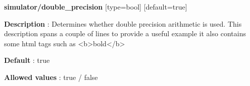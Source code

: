

\begin{DoxyItemize}
\item {\bf \ttfamily simulator/double\_precision} [type=bool] [default=true]
\begin{DoxyItemize}
\item {\bf Description} : Determines whether double precision arithmetic is
used. This description spans a couple of lines to provide a useful example
it also contains some html tags such as <b>bold</b>
\item {\bf Default} : true
\item {\bf Allowed values} : true / false
\end{DoxyItemize}
\end{DoxyItemize}


